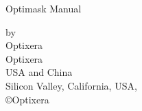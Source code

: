 
\pagestyle{empty} %

\begin{center}

\vspace*{1.0cm} \Huge{Optimask Manual}

\vspace*{1.0cm}
\normalsize
by \\
\vspace*{1.0cm}
\Large
Optixera\\
\vspace*{2.0cm}
\normalsize
Optixera \\
USA and China\\


\vspace*{2.0cm} Silicon Valley, California, USA, \the\year\\ %

\vspace*{2.0cm} \copyright Optixera \the\year\\
\end{center}

\newpage

\pagestyle{plain} %
\setcounter{page}{2}




